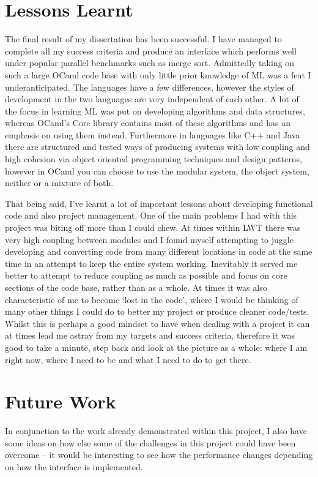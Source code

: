 \documentclass[12pt,twoside,notitlepage]{report}
\begin{document}
%
%
\section{Lessons Learnt}
The final result of my dissertation has been successful. I have managed to complete all my success criteria and produce an interface which performs well under popular parallel benchmarks such as merge sort. Admittedly taking on such a
large OCaml code base with only little prior knowledge of ML was a feat I underanticipated. The languages have a few differences, however the styles of development in the two languages are very independent of each other. A lot of the
focus in learning ML was put on developing algorithms and data structures, whereas OCaml's Core library contains most of these algorithms and has an emphasis on using them instead. Furthermore in languages like C++ and Java there are
structured and tested ways of producing systems with low coupling and high cohesion via object oriented programming techniques and design patterns, however in OCaml you can choose to use the modular system, the object system, neither
or a mixture of both\cite{chailloux2000}. 

That being said, I've learnt a lot of important lessons about developing functional code and also project management. One of the main problems I had with this project was biting off more than I could chew. At times within LWT there
was very high coupling between modules and I found myself attempting to juggle developing and converting code from many different locations in code at the same time in an attempt to keep the entire system working. Inevitably it served
me better to attempt to reduce coupling as much as possible and focus on core sections of the code base, rather than as a whole. At times it was also characteristic of me to become `lost in the code', where I would be thinking of many
other things I could do to better my project or produce cleaner code/tests. Whilst this is perhaps a good mindset to have when dealing with a project it can at times lead me astray from my targets and success criteria, therefore it
was good to take a minute, step back and look at the picture as a whole: where I am right now, where I need to be and what I need to do to get there.

\section{Future Work}
In conjunction to the work already demonstrated within this project, I also have some ideas on how else some of the challenges in this project could have been overcome -- it would be interesting to see how the performance changes
depending on how the interface is implemented.
\end{document}
